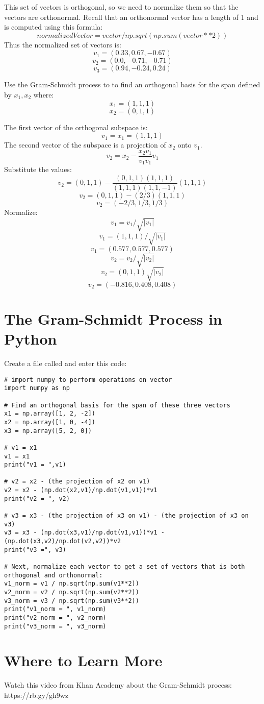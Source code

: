 This set of vectors is orthogonal, so we need to normalize them so that the vectors are orthonormal. Recall that an orthonormal vector has a length of 1 and is computed using this formula:
$$normalizedVector = vector / np.sqrt(np.sum(vector**2))$$
Thus the normalized set of vectors is:
$$v_1 = (0.33,  0.67, -0.67)$$
$$v_2 = (0.0,  -0.71, -0.71 )$$
$$v_3 = (0.94, -0.24,  0.24 ) $$

\begin{Exercise}[title={Gram-Schmidt Process}, label=gram_schmidt]
    Use the Gram-Schmidt process to to find an orthogonal basis for the span defined by $x_1, x_2$ where:
    $$x_1 = (1, 1, 1)$$
	$$x_2 = (0, 1, 1) $$
\end{Exercise}
\begin{Answer}[ref=gram_schmidt]
      The first vector of the orthogonal subspace is: 
		$$v_1 = x_1 =  (1, 1, 1) $$ 
	  The second vector of the subspace is a projection of $x_2$ onto $v_1$.
	  $$v_2 = x_2 - \frac{x_2v_1}{v_1v_1} v_1$$
	  Substitute the values:
	  $$v_2 =  (0, 1, 1)  - \frac{(0,1, 1)(1,1,1)}{(1,1,1)(1,1,-1)}  (1, 1, 1)$$
	  $$v_2 =  (0, 1, 1)  - (2/3) (1, 1, 1) $$
	  $$v_2 =  (-2/3, 1/3, 1/3)$$
	  Normalize:
	  $$v_1 = v_1/\sqrt{|v_1|} $$
	  $$v_1 = (1, 1, 1 )/\sqrt{|v_1|} $$
	  $$v_1 = (0.577, 0.577, 0.577)  $$  
	  $$v_2 = v_2/\sqrt{|v_2|} $$
	  $$v_2 = (0, 1, 1) \sqrt{|v_2|} $$
	  $$v_2 =  (-0.816,  0.408,  0.408) $$
\end{Answer}

\section{The Gram-Schmidt Process in Python}
Create a file called  and enter this code:
\begin{Verbatim}
# import numpy to perform operations on vector
import numpy as np

# Find an orthogonal basis for the span of these three vectors  
x1 = np.array([1, 2, -2]) 
x2 = np.array([1, 0, -4]) 
x3 = np.array([5, 2, 0])    
   
# v1 = x1
v1 = x1
print("v1 = ",v1)

# v2 = x2 - (the projection of x2 on v1)
v2 = x2 - (np.dot(x2,v1)/np.dot(v1,v1))*v1
print("v2 = ", v2)

# v3 = x3 - (the projection of x3 on v1) - (the projection of x3 on v3)
v3 = x3 - (np.dot(x3,v1)/np.dot(v1,v1))*v1 - (np.dot(x3,v2)/np.dot(v2,v2))*v2
print("v3 =", v3)

# Next, normalize each vector to get a set of vectors that is both orthogonal and orthonormal:
v1_norm = v1 / np.sqrt(np.sum(v1**2))
v2_norm = v2 / np.sqrt(np.sum(v2**2))
v3_norm = v3 / np.sqrt(np.sum(v3**2))
print("v1_norm = ", v1_norm)
print("v2_norm = ", v2_norm)
print("v3_norm = ", v3_norm)
\end{Verbatim}

\section{Where to Learn More}
Watch this video from Khan Academy about the Gram-Schmidt process: https://rb.gy/gh9wz


